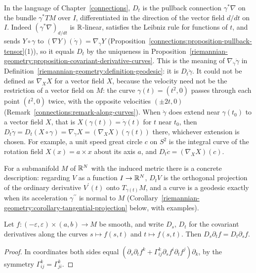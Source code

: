 \begin{remark}\label{riemannian-geometry:remark-derivative-along-curves}
In the language of Chapter~\ref{connections}, $D_t$ is the pullback connection $\gamma^*\nabla$ on the bundle $\gamma^*TM$ over $I$, differentiated in the direction of
the vector field $d/dt$ on $I$. Indeed $(\gamma^*\nabla)_{d/dt}$ is $\mathbb{R}$-linear, satisfies the Leibniz rule for functions of $t$, and sends $Y \circ \gamma$ to
$(\nabla Y)(\dot\gamma) = \nabla_{\dot\gamma}Y$ (Proposition~\ref{connections:proposition-pullback-tensor}(1)), so it equals $D_t$ by the uniqueness in
Proposition~\ref{riemannian-geometry:proposition-covariant-derivative-curves}. This is the meaning of $\nabla_{\dot\gamma}\dot\gamma$ in
Definition~\ref{riemannian-geometry:definition-geodesic}: it is $D_t\dot\gamma$. It could not be defined as $\nabla_XX$ for a vector field $X$, because the velocity
need not be the restriction of a vector field on $M$: the curve $\gamma(t) = (t^2, 0)$ passes through each point $(t^2, 0)$ twice, with the opposite velocities $(\pm2t, 0)$
(Remark~\ref{connections:remark-along-curves}). When $\dot\gamma$ does extend near $\gamma(t_0)$ to a vector field $X$, that is $X(\gamma(t)) = \dot\gamma(t)$ for $t$ near
$t_0$, then $D_t\dot\gamma = D_t(X \circ \gamma) = \nabla_{\dot\gamma}X = (\nabla_XX)(\gamma(t))$ there, whichever extension is chosen. For example, a unit speed great circle
$c$ on $S^2$ is the integral curve of the rotation field $X(x) = a \times x$ about its axis $a$, and $D_t\dot c = (\nabla_XX)(c)$.
\end{remark}

For a submanifold $M$ of $\mathbb{R}^N$ with the induced metric there is a concrete description: regarding $V$ as a function $I \to \mathbb{R}^N$, $D_tV$ is the orthogonal projection of the ordinary derivative $V^{\prime}(t)$
onto $T_{\gamma(t)}M$, and a curve is a geodesic exactly when its acceleration $\gamma^{\prime\prime}$ is normal to $M$ (Corollary~\ref{riemannian-geometry:corollary-tangential-projection} below, with examples).

\begin{lemma}\label{riemannian-geometry:lemma-symmetry}
Let $f \colon (-\varepsilon, \varepsilon) \times (a, b) \to M$ be smooth, and write $D_s$, $D_t$ for the covariant derivatives along the curves $s \mapsto f(s, t)$ and $t \mapsto f(s, t)$. Then $D_s\partial_tf = D_t\partial_sf$.
\end{lemma}

\begin{proof}
In coordinates both sides equal $(\partial_s\partial_tf^k + \Gamma^k_{ij}\partial_sf^i\partial_tf^j)\partial_k$, by the symmetry $\Gamma^k_{ij} = \Gamma^k_{ji}$.
\end{proof}

